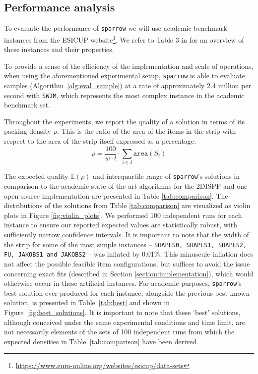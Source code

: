 \documentclass[preprint, 11pt, authoryear]{elsarticle}
\begin{document}
\subsection{Performance analysis} \label{section:performance_analysis}
To evaluate the performance of \texttt{sparrow} we will use academic benchmark instances from the ESICUP website\footnote{\url{https://www.euro-online.org/websites/esicup/data-sets}}.
We refer to Table 3 in \citet{sato2019raster} for an overview of these instances and their properties.

To provide a sense of the efficiency of the implementation and scale of operations, when using the aforementioned experimental setup, \texttt{sparrow} is able to evaluate samples (Algorithm~\ref{alg:eval_sample}) at a rate of approximately 2.4 million per second with \texttt{SWIM}, which represents the most complex instance in the academic benchmark set.

Throughout the experiments, we report the quality of a solution in terms of its packing density $\rho$. 
This is the ratio of the area of the items in the strip with respect to the area of the strip itself expressed as a percentage:
\begin{equation}
    \rho = \frac{100}{w \cdot l} \cdot \sum_{i \in I} \texttt{area}(S_i)
\end{equation}

The expected quality $\mathbb{E}(\rho)$ and interquartile range of \texttt{sparrow}'s solutions in comparison to the academic state of the art algorithms for the 2DISPP and one open-source implementation are presented in Table \ref{tab:comparison}.
The distributions of the solutions from Table \ref{tab:comparison} are visualized as violin plots in Figure \ref{fig:violin_plots}. 
We performed 100 independent runs for each instance to ensure our reported expected values are statistically robust, with sufficiently narrow confidence intervals.
It is important to note that the width of the strip for some of the most simple instances -- \texttt{SHAPES0, SHAPES1, SHAPES2, FU, JAKOBS1 and JAKOBS2} -- was inflated by 0.01\%.
This minuscule inflation does not affect the possible feasible item configurations, but suffices to avoid the issue concerning exact fits (described in Section \ref{section:implementation}), which would otherwise occur in these artificial instances.
For academic purposes, \texttt{sparrow}'s best solution ever produced for each instance, alongside the previous best-known solution, is presented in Table~\ref{tab:best} and shown in Figure~\ref{fig:best_solutions}.
It is important to note that these `best' solutions, although conceived under the same experimental conditions and time limit, are not necessarily elements of the sets of 100 independent runs from which the expected densities in Table~\ref{tab:comparison} have been derived.
\end{document}
